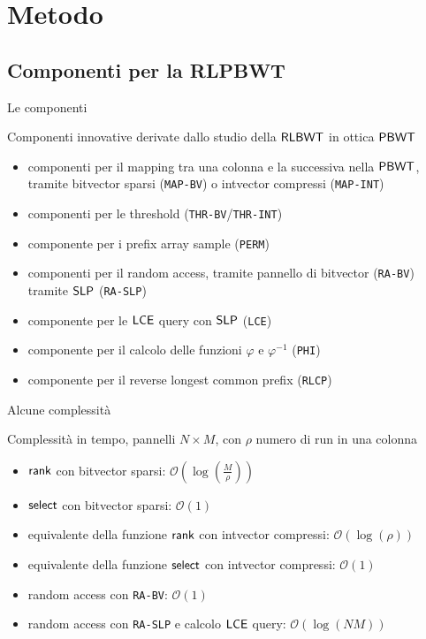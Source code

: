 \documentclass[]{beamer}
\def\SLP{\mbox{\rm {\sf SLP}}}
\def\rank{\mbox{\rm {\sf rank}}}
\def\LCE{\mbox{\rm {\sf LCE}}}
\def\select{\mbox{\rm {\sf select}}}
\def\RLBWT{\mbox{\rm {\sf RLBWT}}}
\def\PBWT{\mbox{\rm {\sf PBWT}}}
\def\LCE{\mbox{\rm {\sf LCE}}}
\begin{document}
\section{Metodo}
\subsection{Componenti per la RLPBWT}
\begin{frame}{Le componenti}
  \begin{block}{Componenti innovative derivate dallo studio della $\RLBWT$ in
      ottica $\PBWT$} 
    \begin{itemize}
      \item componenti per il mapping tra una colonna e la successiva nella
      $\PBWT$, tramite bitvector sparsi (\texttt{MAP-BV}) o intvector compressi
      (\texttt{MAP-INT})
      \item componenti per le threshold (\texttt{THR-BV}/\texttt{THR-INT})
      \item componente per i prefix array sample (\texttt{PERM})
      \item componenti per il random access, tramite pannello di bitvector
      (\texttt{RA-BV}) tramite $\SLP$ (\texttt{RA-SLP})
      \item componente per le $\LCE$ query con $\SLP$ (\texttt{LCE})
      \item componente per il calcolo delle funzioni $\varphi$ e $\varphi^{-1}$
      (\texttt{PHI})
      \item componente per il reverse longest common prefix (\texttt{RLCP})
    \end{itemize}
  \end{block}
\end{frame}
\begin{frame}{Alcune complessità}
  \begin{block}{Complessità in tempo, pannelli $N\times M$, con $\rho$ numero di
    run in una colonna}
    \begin{itemize}
      \item $\rank$ con bitvector sparsi:
      $\mathcal{O}\left(\log\left(\frac{M}{\rho}\right)\right)$
      \item $\select$ con bitvector sparsi: $\mathcal{O}\left(1\right)$
      \item equivalente della funzione $\rank$ con intvector compressi:
      $\mathcal{O}\left(\log\left(\rho\right)\right)$
      \item equivalente della funzione $\select$ con intvector compressi:
      $\mathcal{O}\left(1\right)$ 
      \item random access con \texttt{RA-BV}: $\mathcal{O}(1)$
      \item random access con \texttt{RA-SLP} e calcolo $\LCE$ query:
      $\mathcal{O} (\log(NM))$
    \end{itemize}
  \end{block}
\end{frame}
\end{document}
